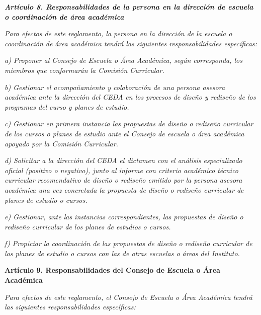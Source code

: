 \textit{\textbf{Artículo 8. Responsabilidades de la persona en la dirección de escuela o coordinación de área académica}}\par

\textit{Para efectos de este reglamento, la persona en la dirección de la escuela o coordinación de área académica tendrá las siguientes responsabilidades específicas:}\par

\textit{a) Proponer al Consejo de Escuela o Área Académica, según corresponda, los miembros que conformarán la Comisión Curricular. }\par

\textit{b) Gestionar el acompañamiento y colaboración de una persona asesora académica ante la dirección del CEDA en los procesos de diseño y rediseño de los programas del curso y planes de estudio.}\par

\textit{c) Gestionar en primera instancia las propuestas de diseño o rediseño curricular de los cursos o planes de estudio ante el Consejo de escuela o área académica apoyado por la Comisión Curricular.}\par

\textit{d) Solicitar a la dirección del CEDA el dictamen con el análisis especializado oficial (positivo o negativo), junto al informe con criterio académico técnico curricular }\textit{recomendativo}\textit{ de diseño o rediseño emitido por la persona asesora académica una vez concretada la propuesta de diseño o rediseño curricular de planes de estudio o cursos.}\par

\textit{e) Gestionar, ante las instancias correspondientes, las propuestas de diseño o rediseño curricular de los planes de estudios o cursos. }\par

\textit{f) Propiciar la coordinación de las propuestas de diseño o rediseño curricular de los planes de estudio o cursos con las de otras escuelas o áreas del Instituto.}\par

\textbf{Artículo 9. Responsabilidades del Consejo de Escuela o Área Académica}\par

\textit{Para efectos de este reglamento, el Consejo de Escuela o Área Académica}\textit{ }\textit{tendrá las siguientes responsabilidades específicas:}\textit{ }\par

